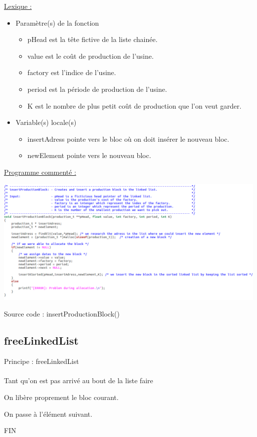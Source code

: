 \documentclass[a4paper]{article}
\newcommand\tab[1][1cm]{\hspace*{#1}}
\begin{document}
\underline{Lexique :}
\begin{itemize}
\item Paramètre(s) de la fonction  
\begin{itemize}
\item pHead est la tête fictive de la liste chainée.
\item value est le coût de production de l'usine.
\item factory est l'indice de l'usine.
\item period est la période de production de l'usine.
\item K est le nombre de plus petit coût de production que l'on veut garder.
\end{itemize}
\item Variable(s) locale(s)
\begin{itemize}
\item insertAdress pointe vers le bloc où on doit insérer le nouveau bloc.
\item newElement pointe vers le nouveau bloc.
\end{itemize}
\end{itemize}

\underline{Programme commenté :}
\begin{center}
\includegraphics[scale=0.39]{insertProductionBlock.png}

Source code : insertProductionBlock()
\end{center}

\subsection{freeLinkedList}
\begin{algorithm}
Principe : freeLinkedList
\\
\\
\tab Tant qu'on est pas arrivé au bout de la liste faire

\tab \tab On libère proprement le bloc courant.

\tab \tab On passe à l'élément suivant.

FIN
\end{algorithm}
\end{document}
